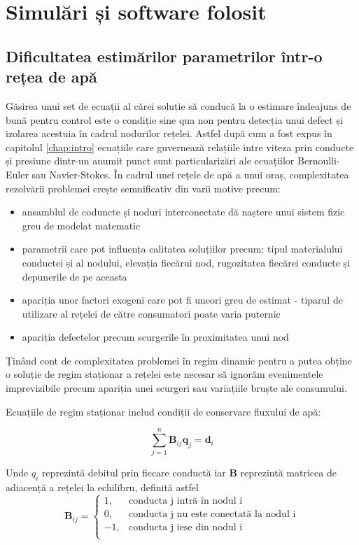 \chapter{Simulări și software folosit}
\label{chap:simulari}

\section{Dificultatea estimărilor parametrilor într-o rețea de apă}

Găsirea unui set de ecuații al cărei soluție să conducă la o estimare îndeajuns de bună pentru control este o condiție sine qua non pentru detecția unui defect și izolarea acestuia în cadrul nodurilor rețelei. Astfel după cum a fost expus în capitolul \ref{chap:intro} ecuațiile care guvernează relațiile intre viteza prin conducte și presiune dintr-un anumit punct sunt particularizări ale ecuațiilor Bernoulli-Euler sau Navier-Stokes. În cadrul unei rețele de apă a unui oraș, complexitatea rezolvării problemei crește semnificativ din varii motive precum:
\begin{itemize}
\item ansamblul de coduncte și noduri interconectate dă naștere unui sistem fizic greu de modelat matematic
\item parametrii care pot influența calitatea soluțiilor precum: tipul materialului conductei și al nodului, elevația fiecărui nod, rugozitatea fiecărei conducte și depunerile de pe aceasta
\item apariția unor factori exogeni care pot fi uneori greu de estimat - tiparul de utilizare al rețelei de către consumatori poate varia puternic
\item apariția defectelor precum scurgerile în proximitatea unui nod
\end{itemize}

Ținând cont de complexitatea problemei în regim dinamic pentru a putea obține o soluție de regim staționar a rețelei este necesar să ignorăm evenimentele imprevizibile precum apariția unei scurgeri sau variațiile bruște ale consumului.

Ecuațiile de regim staționar includ condiții de conservare fluxului de apă:

\begin{equation}
\label{Ecuația de conservare a rețelei de apă}
\sum\limits_{j=1}^{n} \mathbf B_{ij}\mathbf q_j=\mathbf d_i
\end{equation}

Unde $q_i$ reprezintă debitul prin fiecare conductă iar \textbf{B} reprezintă matricea de adiacență a rețelei la echilibru, definită astfel
\begin{equation}
\textbf{B}_{ij} = 
     \begin{cases}
       1, & \text{conducta j intră în nodul i}\\
       0, & \text{conducta j nu este conectată la nodul i} \\
       -1, & \text{conducta j iese din nodul i}\\ 
     \end{cases}
\end{equation}

